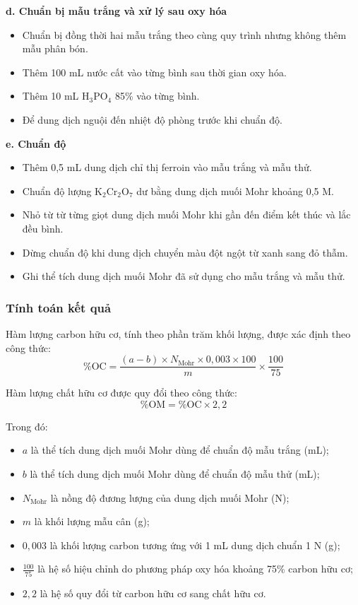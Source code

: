 \noindent\textbf{d. Chuẩn bị mẫu trắng và xử lý sau oxy hóa}
\begin{itemize}
  \item Chuẩn bị đồng thời hai mẫu trắng theo cùng quy trình nhưng không thêm mẫu phân bón.
  \item Thêm 100 mL nước cất vào từng bình sau thời gian oxy hóa.
  \item Thêm 10 mL \(\mathrm{H_3PO_4}\) 85\% vào từng bình.
  \item Để dung dịch nguội đến nhiệt độ phòng trước khi chuẩn độ.
\end{itemize}

\noindent\textbf{e. Chuẩn độ}
\begin{itemize}
  \item Thêm 0,5 mL dung dịch chỉ thị ferroin vào mẫu trắng và mẫu thử.
  \item Chuẩn độ lượng \(\mathrm{K_2Cr_2O_7}\) dư bằng dung dịch muối Mohr khoảng 0,5 M.
  \item Nhỏ từ từ từng giọt dung dịch muối Mohr khi gần đến điểm kết thúc và lắc đều bình.
  \item Dừng chuẩn độ khi dung dịch chuyển màu đột ngột từ xanh sang đỏ thẫm.
  \item Ghi thể tích dung dịch muối Mohr đã sử dụng cho mẫu trắng và mẫu thử.
\end{itemize}

\subsubsection{Tính toán kết quả}
Hàm lượng carbon hữu cơ, tính theo phần trăm khối lượng, được xác định theo công thức:
\[
  \%\mathrm{OC} = \frac{(a-b) \times N_{\mathrm{Mohr}} \times 0{,}003 \times 100}{m} \times \frac{100}{75}
\]

Hàm lượng chất hữu cơ được quy đổi theo công thức:
\[
  \%\mathrm{OM} = \%\mathrm{OC} \times 2{,}2
\]

Trong đó:
\begin{itemize}
  \item $a$ là thể tích dung dịch muối Mohr dùng để chuẩn độ mẫu trắng (mL);
  \item $b$ là thể tích dung dịch muối Mohr dùng để chuẩn độ mẫu thử (mL);
  \item $N_{\mathrm{Mohr}}$ là nồng độ đương lượng của dung dịch muối Mohr (N);
  \item $m$ là khối lượng mẫu cân (g);
  \item $0{,}003$ là khối lượng carbon tương ứng với 1 mL dung dịch chuẩn 1 N (g);
  \item $\frac{100}{75}$ là hệ số hiệu chỉnh do phương pháp oxy hóa khoảng 75\% carbon hữu cơ;
  \item $2{,}2$ là hệ số quy đổi từ carbon hữu cơ sang chất hữu cơ.
\end{itemize}

